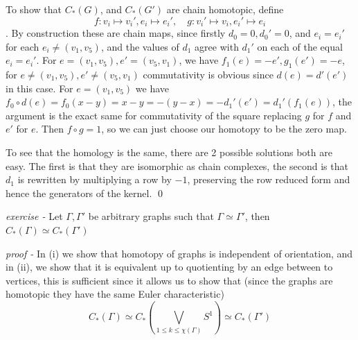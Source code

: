 \documentclass[11pt]{article}
\theoremstyle{definition}
\begin{document}
    To show that \(C_*(G)\), and \(C_*(G')\) are chain homotopic, define \[f:v_i \mapsto v_i', e_i \mapsto e_i', \quad g: v_i' \mapsto v_i, e_i' \mapsto e_i\].
    By construction these are chain maps, since firstly \(d_0 = 0, d_0' = 0\), and \(e_i = e_i'\) for each \(e_i \neq (v_1,v_5)\), and the values of \(d_1\) agree with \(d_1'\) on each of the equal \(e_i = e_i'\). For \(e = (v_1,v_5), e' = (v_5,v_1)\), we have \(f_1(e) = -e',g_1(e')=-e\), for \(e \neq (v_1,v_5), e' \neq (v_5,v_1)\) commutativity is obvious since \(d(e) = d'(e')\) in this case. For \(e = (v_1,v_5)\) we have \(f_0 \circ d(e) = f_0(x-y) = x-y = -(y-x) = -d_1'(e') = d_1'(f_1(e))\), the argument is the exact same for commutativity of the square replacing \(g\) for \(f\) and \(e'\) for \(e\). Then \(f \circ g = 1\), so we can just choose our homotopy to be the zero map.

    To see that the homology is the same, there are 2 possible solutions both are easy. The first is that they are isomorphic as chain complexes, the second is that \(d_1\) is rewritten by multiplying a row by \(-1\), preserving the row reduced form and hence the generators of the kernel. \qed




    
    \emph{exercise - }\label{HEx4} Let \(\Gamma, \Gamma'\) be arbitrary graphs such that \(\Gamma \simeq \Gamma'\), then \(C_*(\Gamma) \simeq C_*(\Gamma')\)

    \emph{proof - } In (i) we show that homotopy of graphs is independent of orientation, and in (ii), we show that it is equivalent up to quotienting by an edge between to vertices, this is sufficient since it allows us to show that (since the graphs are homotopic they have the same Euler characteristic)
    \[C_*(\Gamma) \simeq C_*(\bigvee_{1 \leq k \leq \chi(\Gamma)} S^1) \simeq C_*(\Gamma')\]
\end{document}
